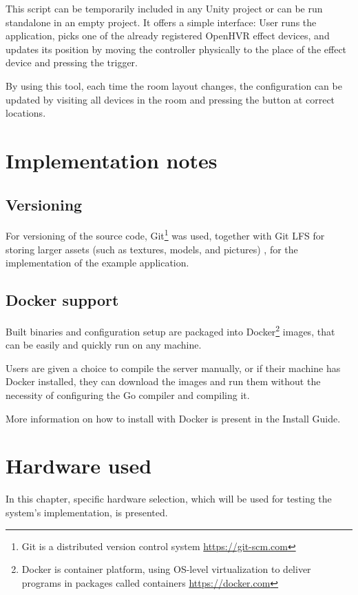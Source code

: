 This script can be temporarily included in any Unity project or can be run
standalone in an empty project. It offers a simple interface:
User runs the application, picks one of the already registered OpenHVR
effect devices, and updates its position by moving the controller physically
to the place of the effect device and pressing the trigger.


By using this tool, each time the room layout changes, the configuration can
be updated by visiting all devices in the room and pressing the button at
correct locations.


\hypertarget{x-implementation-notes}{\section{Implementation notes}}
\hypertarget{x-versioning}{\subsection{Versioning}}
For versioning of the source code, Git\footnote{Git is a distributed version 
control system \href{https://git-scm.com}{https://git-scm.com}}
was used, together with Git LFS for
storing larger assets (such as textures, models, and pictures)
, for the implementation of the example application.


\hypertarget{x-docker-support}{\subsection{Docker support}}
Built binaries and configuration setup are packaged into Docker\footnote{Docker
 is container platform, using OS-level virtualization to deliver programs in 
 packages called containers \href{https://docker.com}{https://docker.com}}
images, that can be easily and quickly run on any machine.


Users are given a choice to compile the server manually, or if their machine has
Docker installed, they can download the images and run them without
the necessity of configuring the Go compiler and compiling it.

More information on how to install with Docker is present in the Install Guide.

\hypertarget{x-hardware-used}{\section{Hardware used}}
In this chapter, specific hardware selection, which will be used for testing the
system’s implementation, is presented.

